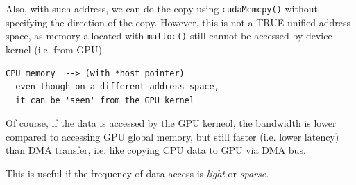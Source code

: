 
Also, with such address, we can do the
copy using \verb!cudaMemcpy()! without specifying the direction of the copy.
However, this is not a TRUE unified address space, as memory allocated with
\verb!malloc()! still cannot be accessed by device kernel (i.e. from GPU).



\begin{verbatim}
CPU memory  --> (with *host_pointer)
  even though on a different address space,
  it can be 'seen' from the GPU kernel
\end{verbatim}

Of course, if the data is accessed by the GPU kerneol, the bandwidth is lower
compared to accessing GPU global memory, but still faster (i.e. lower latency)
than DMA transfer, i.e. like copying CPU data to GPU via DMA bus.

This is useful if the frequency of data access is {\it light} or {\it sparse}.


